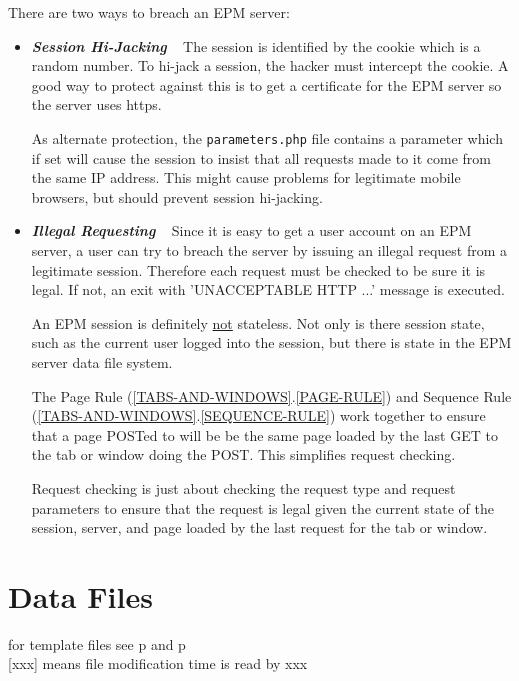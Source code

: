 \documentclass[12pt]{article}
\newcommand{\key}[1]{{\bf \em #1}}
\newcommand{\pagref}[1]{p\pageref{#1}}
\newcommand{\sref}[2]{(\ref{#1}.\ref{#2})}
\begin{document}
There are two ways to breach an EPM server:

\begin{itemize}

\item \key{Session Hi-Jacking} ~ The session is identified
by the cookie which is a random number.  To hi-jack a session,
the hacker must intercept the cookie.  A good way to 
protect against this is to get a certificate for the EPM
server so the server uses https.

As alternate protection, the {\tt parameters.php} file
contains a parameter which if set will cause the session
to insist that all requests made to it come from the same
IP address.  This might cause problems for legitimate mobile browsers,
but should prevent session hi-jacking.

\item \key{Illegal Requesting} ~ Since it is easy to get a user
account on an EPM server, a user can try to breach the server by issuing
an illegal request from a legitimate session.  Therefore each
request must be checked to be sure it is legal.  If not,
an exit with 'UNACCEPTABLE HTTP ...' message is executed.

An EPM session is definitely \underline{not} stateless.
Not only is there session state, such as the current
user logged into the session, but there is state in the
EPM server data file system.

The Page Rule \sref{TABS-AND-WINDOWS}{PAGE-RULE}
and Sequence Rule \sref{TABS-AND-WINDOWS}{SEQUENCE-RULE}
work together to ensure that a page POSTed to will be
be the same page loaded by the last GET to the tab or
window doing the POST.  This simplifies request checking.

Request checking is just about checking the request type and
request parameters to ensure that the request is legal given the
current state of the session, server, and page loaded by the
last request for the tab or window.

\end{itemize}

\newpage

\section{Data Files}

for template files see \pagref{JOB-TEMPLATES} and \pagref{TEMPLATE.OPTN} \\{}
[xxx] means file modification time is read by xxx
\end{document}
